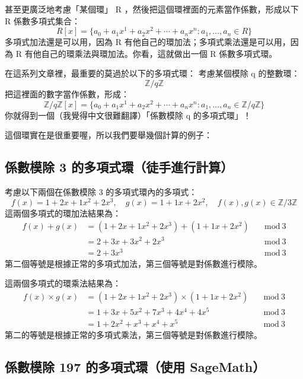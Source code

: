 \documentclass[
]{article}
\begin{document}
甚至更廣泛地考慮「某個環」 R ，然後把這個環裡面的元素當作係數，形成以下
R 係數多項式集合： \[
R[x]  =\{ a_{0}+a_{1}x^{1}+a_{2}x^{2}+\cdots+a_{n}x^n : a_{1},\dots,a_{n}\in R  \}
\] 多項式加法還是可以用，因為 R
有他自己的環加法；多項式乘法還是可以用，因為 R
有他自己的環乘法與環加法。你看，這就做出一個 R 係數多項式環。

在這系列文章裡，最重要的莫過於以下的多項式環： 考慮某個模除 q 的整數環：
\[
\mathbb{Z}/q\mathbb{Z}
\] 把這裡面的數字當作係數，形成： \[
\mathbb{Z}/q\mathbb{Z}[x]  =\{ a_{0}+a_{1}x^{1}+a_{2}x^{2}+\cdots+a_{n}x^n : a_{1},\dots,a_{n}\in \mathbb{Z}/q\mathbb{Z}  \}
\] 你就得到一個（我覺得中文很難翻譯）「係數模除 q 的多項式環」！

這個環實在是很重要喔，所以我們要舉幾個計算的例子：

\hypertarget{ux4fc2ux6578ux6a21ux9664-3-ux7684ux591aux9805ux5f0fux74b0ux5f92ux624bux9032ux884cux8a08ux7b97}{%
\subsection{係數模除 3
的多項式環（徒手進行計算）}\label{ux4fc2ux6578ux6a21ux9664-3-ux7684ux591aux9805ux5f0fux74b0ux5f92ux624bux9032ux884cux8a08ux7b97}}

考慮以下兩個在係數模除 3 的多項式環內的多項式： \[
f(x) = 1+2x+1x^{2}+2x^{3} , \quad g(x) = 1+1x+2x^{2}, \quad f(x),g(x)\in \mathbb{Z}/3\mathbb{Z}
\] 這兩個多項式的環加法結果為： \[
\begin{aligned}
f(x) + g(x) &= 
(1+2x+1x^{2}+2x^{3}) + (1+1x+2x^{2})  &\quad \mathrm{mod} \ 3 \\
&= 2 + 3x+3x^{2} + 2x^{3}&\quad \mathrm{mod} \ 3 \\
&= 2 + 3x^{3}&\quad \mathrm{mod} \ 3
\end{aligned}
\] 第二個等號是根據正常的多項式加法，第三個等號是對係數進行模除。

這兩個多項式的環乘法結果為： \[
\begin{aligned}
f(x) \times g(x) &= 
(1+2x+1x^{2}+2x^{3}) \times (1+1x+2x^{2})&\quad \mathrm{mod} \ 3\\
&= 1 + 3 x + 5 x^2 + 7 x^3 + 4 x^4 + 4 x^5&\quad \mathrm{mod} \ 3\\
&= 1 + 2x^{2}+x^{3}+x^{4}+x^{5}&\quad \mathrm{mod} \ 3
\end{aligned}
\] 第二的等號是根據正常的多項式乘法，第三個等號是對係數進行模除。

\hypertarget{ux4fc2ux6578ux6a21ux9664-197-ux7684ux591aux9805ux5f0fux74b0ux4f7fux7528-sagemath}{%
\subsection{係數模除 197 的多項式環（使用
SageMath）}\label{ux4fc2ux6578ux6a21ux9664-197-ux7684ux591aux9805ux5f0fux74b0ux4f7fux7528-sagemath}}
\end{document}
